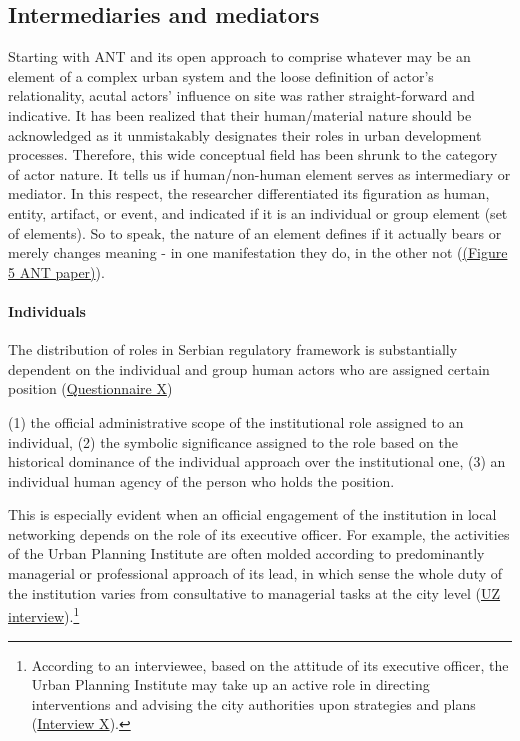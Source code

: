 \documentclass[11pt]{report}
\begin{document}
\subsection{Intermediaries and mediators}

Starting with ANT and its open approach to comprise whatever may be an element of a complex urban system and the loose definition of actor’s relationality, 
acutal actors’ influence on site was rather straight-forward and indicative.
It has been realized that their human/material nature should be acknowledged as it unmistakably designates their roles in urban development processes.
Therefore, this wide conceptual field has been shrunk to the category of actor nature.
It tells us if human/non-human element serves as intermediary or mediator.
In this respect, the researcher differentiated its figuration as human, entity, artifact, or event, and  indicated if it is an individual or group element (set of elements).
So to speak, the nature of an element defines if it actually bears or merely changes meaning - in one manifestation they do, in the other not (\href{ref}{(Figure 5 ANT paper)}).

\paragraph{Individuals}
The distribution of roles in Serbian regulatory framework is substantially dependent on the individual and group human actors who are assigned certain position (\href{Questionnaire Experts Post-socialist}{Questionnaire X})

(1) the official administrative scope of the institutional role assigned to an individual,
(2) the symbolic significance assigned to the role based on the historical dominance of the individual approach over the institutional one,
(3) an individual human agency of the person who holds the position.

This is especially evident when an official engagement of the institution in local networking depends on the role of its executive officer.
For example, the activities of the Urban Planning Institute are often molded according to predominantly managerial or professional approach of its lead, in which sense the whole duty of the institution varies from consultative to managerial tasks at the city level (\href{ref}{UZ interview}).\footnote{
According to an interviewee, based on the attitude of its executive officer, the Urban Planning Institute may take up an active role in directing interventions and advising the city authorities upon strategies and plans (\href{InterviewX}{Interview X}).}
\end{document}

